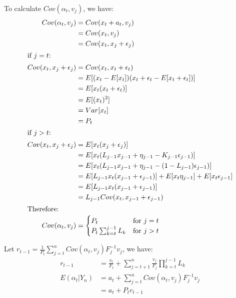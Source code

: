 \documentclass{article}
\begin{document}
\par\noindent
To calculate \(Cov(\alpha_{t}, v_{j})\), we have:
\begin{align*}
    Cov(\alpha_{t}, v_{j}) &= Cov(x_{t} + a_{t}, v_{j})\\
    &= Cov(x_{t}, v_{j}) \\
    &= Cov(x_{t}, x_{j} + \epsilon_{j})\\
\intertext{if  \(j = t\):}
    Cov(x_{t}, x_{j} + \epsilon_{j}) &=Cov(x_{t}, x_{t} + \epsilon_{t})\\
    &= E[(x_{t} - E[x_{t}]) (x_{t} + \epsilon_{t} - E[x_{t} + \epsilon_{t} ])]\\
    &= E[x_{t} (x_{t} + \epsilon_{t})]\\
    &= E[(x_{t})^2]\\ 
    &= Var[x_t]\\
    &= P_t\\
\intertext{if  \(j > t\):}
    Cov(x_{t}, x_{j} + \epsilon_{j}) &= E[x_{t} (x_{j} + \epsilon_{j})]\\
    &= E[x_{t} (L_{j-1}x_{j-1} +\eta_{j-1}-K_{j-1} \epsilon_{j-1})]\\
    &= E[x_{t} (L_{j-1}x_{j-1} +\eta_{j-1}-(1-L_{j-1}) \epsilon_{j-1})]\\
    &= E[L_{j-1}x_{t}(x_{j-1} + \epsilon_{j-1})] + E[x_{t}\eta_{j-1}]+ E[x_{t}\epsilon_{j-1}]\\
    &= E[L_{j-1}x_{t}(x_{j-1} + \epsilon_{j-1})] \\
    &= L_{j-1} Cov(x_{t}, x_{j-1} + \epsilon_{j-1})\\
\intertext{Therefore:}
    Cov(\alpha_{t}, v_{j})
    &= 
    \begin{cases}
    P_t & \text{for }j = t\\ 
    P_t\sum_{k=t}^{j-1}L_{k} & \text{for }  j > t
    \end{cases} \label{eq:covariance}\\
\end{align*}

\par\noindent
Let \(r_{t-1} =\frac{1}{P_t}\sum_{j=t}^{n}Cov(\alpha_{t}, v_{j})F_{j}^{-1}v_{j}\), we have:
\begin{align*}
    r_{t-1} &=\frac{v_t}{F_t} + \sum_{j=t+1}^{n}\frac{v_{j}}{F_{j}}\prod_{k=t}^{j-1}L_k\\
    E(\alpha_{t}|Y_{n}) &= a_t + \sum_{j=t}^{n}Cov(\alpha_{t}, v_{j})F_{j}^{-1}v_{j}\\
    &= a_t + P_t r_{t-1}
\end{align*}
\end{document}
